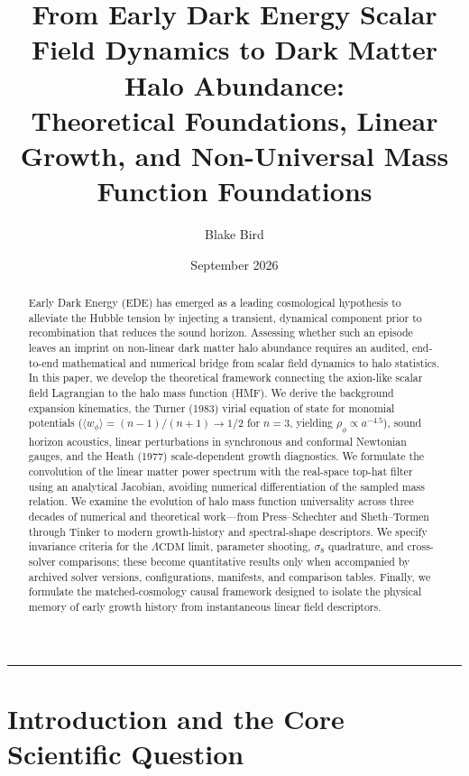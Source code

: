 \documentclass[11pt]{article}
\title{\textbf{From Early Dark Energy Scalar Field Dynamics to Dark Matter Halo Abundance:}\\[0.5ex]
\large Theoretical Foundations, Linear Growth, and Non-Universal Mass Function Foundations}
\author{Blake Bird}
\date{September 2026}
\begin{document}
\maketitle

\begin{abstract}
Early Dark Energy (EDE) has emerged as a leading cosmological hypothesis to alleviate the Hubble tension by injecting a transient, dynamical component prior to recombination that reduces the sound horizon. Assessing whether such an episode leaves an imprint on non-linear dark matter halo abundance requires an audited, end-to-end mathematical and numerical bridge from scalar field dynamics to halo statistics. In this paper, we develop the theoretical framework connecting the axion-like scalar field Lagrangian to the halo mass function (HMF). We derive the background expansion kinematics, the Turner (1983) virial equation of state for monomial potentials ($\langle w_\phi \rangle = (n-1)/(n+1) \to 1/2$ for $n=3$, yielding $\rho_\phi \propto a^{-4.5}$), sound horizon acoustics, linear perturbations in synchronous and conformal Newtonian gauges, and the Heath (1977) scale-dependent growth diagnostics. We formulate the convolution of the linear matter power spectrum with the real-space top-hat filter using an analytical Jacobian, avoiding numerical differentiation of the sampled mass relation. We examine the evolution of halo mass function universality across three decades of numerical and theoretical work---from Press--Schechter and Sheth--Tormen through Tinker to modern growth-history and spectral-shape descriptors. We specify invariance criteria for the $\Lambda\mathrm{CDM}$ limit, parameter shooting, $\sigma_8$ quadrature, and cross-solver comparisons; these become quantitative results only when accompanied by archived solver versions, configurations, manifests, and comparison tables. Finally, we formulate the matched-cosmology causal framework designed to isolate the physical memory of early growth history from instantaneous linear field descriptors.
\end{abstract}

\tableofcontents
\vspace{1.5em}
\hrule
\vspace{1.5em}

\section{Introduction and the Core Scientific Question}
\label{sec:intro}
\end{document}
